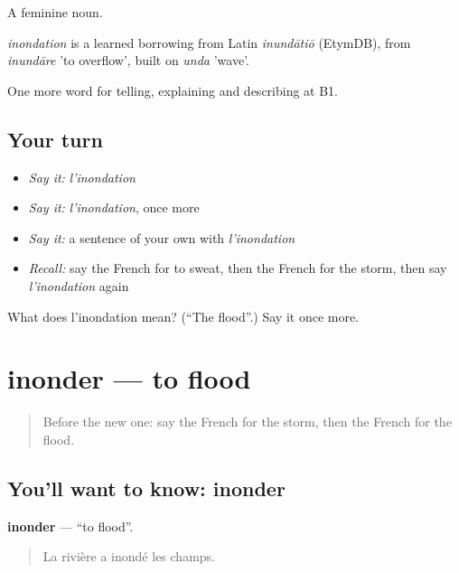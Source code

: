 A feminine noun.

\begin{cousinweb}
\emph{inondation} is a learned borrowing from Latin \emph{inundātiō} (EtymDB), from \emph{inundāre} 'to overflow', built on \emph{unda} 'wave'.
\end{cousinweb}

\begin{grammarlens}[title={What you've built}]
One more word for telling, explaining and describing at B1.
\end{grammarlens}

\subsection*{Your turn}
\begin{itemize}
\raggedright
  \item \emph{Say it:} \emph{l'inondation}
  \item \emph{Say it:} \emph{l'inondation}, once more
  \item \emph{Say it:} a sentence of your own with \emph{l'inondation}
  \item \emph{Recall:} say the French for to sweat, then the French for the storm, then say \emph{l'inondation} again
\end{itemize}

\begin{tcolorbox}[breakable,colback=teal!4,colframe=teal!35!black,title={Before you move on}]
What does l'inondation mean? (\textquotedblleft{}The flood\textquotedblright{}.) Say it once more.
\end{tcolorbox}
\section[inonder]{inonder — to flood}

\label{lesson:FR-C465-inonder}



\begin{quote}
Before the new one: say the French for the storm, then the French for the flood.
\end{quote}

\subsection*{You'll want to know: inonder}
\textbf{inonder} — \textquotedblleft{}to flood\textquotedblright{}.

\begin{quote}
La rivière a inondé les champs.
\end{quote}

